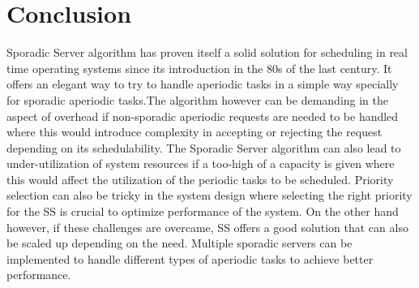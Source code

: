 \documentclass[conference]{IEEEtran}
\begin{document}
\section{Conclusion}
Sporadic Server algorithm has proven itself a solid solution for scheduling in real time operating systems since its introduction in the 80s of the last century. It offers an elegant way to try to handle aperiodic tasks in a simple way specially for sporadic aperiodic tasks.The algorithm however can be demanding in the aspect of overhead if non-sporadic aperiodic requests are needed to be handled where this would introduce complexity in accepting or rejecting the request depending on its schedulability. The Sporadic Server algorithm can also lead to under-utilization of system resources if a too-high of a capacity is given where this would affect the utilization of the periodic tasks to be scheduled. Priority selection can also be tricky in the system design where selecting the right priority for the SS is crucial to optimize performance of the system. On the other hand however, if these challenges are overcame, SS offers a good solution that can also be scaled up depending on the need. Multiple sporadic servers\cite{multiple-sporadic-servers} can be implemented to handle different types of aperiodic tasks to achieve better performance.
 

\end{document}
